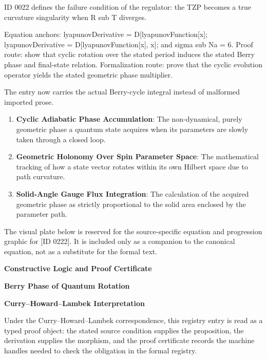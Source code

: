 ID 0022 defines the failure condition of the regulator: the TZP becomes a true curvature singularity when R sub T diverges.

Equation anchors: lyapunovDerivative = D[lyapunovFunction[x]; lyapunovDerivative = D[lyapunovFunction[x], x]; and sigma sub Na = 6. Proof route: show that cyclic rotation over the stated period induces the stated Berry phase and final-state relation. Formalization route: prove that the cyclic evolution operator yields the stated geometric phase multiplier.

The entry now carries the actual Berry-cycle integral instead of malformed imported prose.
\endgroup

\begin{enumerate}[leftmargin=1.6em,itemsep=6pt,topsep=4pt]
\item \textbf{Cyclic Adiabatic Phase Accumulation}: The non-dynamical, purely geometric phase a quantum state acquires when its parameters are slowly taken through a closed loop.
\item \textbf{Geometric Holonomy Over Spin Parameter Space}: The mathematical tracking of how a state vector rotates within its own Hilbert space due to path curvature.
\item \textbf{Solid-Angle Gauge Flux Integration}: The calculation of the acquired geometric phase as strictly proportional to the solid area enclosed by the parameter path.
\end{enumerate}

\begingroup\footnotesize\sloppy
The visual plate below is reserved for the source-specific equation and progression graphic for [ID 0222]. It is included only as a companion to the canonical equation, not as a substitute for the formal text.
\par\endgroup
\ifTZPDarkEdition
{}
\fi

\clearpage
\begingroup\tzpsupportsetup
\noindent\textbf{\fontsize{10.8pt}{12.8pt}\selectfont [ID 0222] Constructive Logic and Proof Certificate}\par
\noindent\textbf{\fontsize{10pt}{12pt}\selectfont Berry Phase of Quantum Rotation}\par
\vspace{0.45em}
\begingroup
\footnotesize
\setlength{\parskip}{0.22em}
\setlength{\parindent}{0pt}
\noindent\textbf{Curry--Howard--Lambek Interpretation}\par
Under the Curry--Howard--Lambek correspondence, this registry entry is read as a typed proof
object: the stated source condition supplies the proposition, the derivation supplies the
morphism, and the proof certificate records the machine handles needed to check the obligation
in the formal registry.


